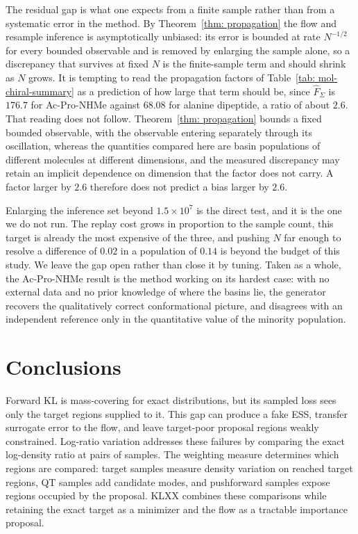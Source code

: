 \documentclass{article}
\begin{document}
The residual gap is what one expects from a finite sample rather than from a systematic error in the method. By Theorem~\ref{thm: propagation} the flow and resample inference is asymptotically unbiased: its error is bounded at rate \(N^{-1/2}\) for every bounded observable and is removed by enlarging the sample alone, so a discrepancy that survives at fixed \(N\) is the finite-sample term and should shrink as \(N\) grows. It is tempting to read the propagation factors of Table~\ref{tab: mol-chiral-summary} as a prediction of how large that term should be, since \(\hat F_\Sigma\) is \(176.7\) for Ac-Pro-NHMe against \(68.08\) for alanine dipeptide, a ratio of about \(2.6\). That reading does not follow. Theorem~\ref{thm: propagation} bounds a fixed bounded observable, with the observable entering separately through its oscillation, whereas the quantities compared here are basin populations of different molecules at different dimensions, and the measured discrepancy may retain an implicit dependence on dimension that the factor does not carry. A factor larger by \(2.6\) therefore does not predict a bias larger by \(2.6\).

Enlarging the inference set beyond \(1.5\times10^7\) is the direct test, and it is the one we do not run. The replay cost grows in proportion to the sample count, this target is already the most expensive of the three, and pushing \(N\) far enough to resolve a difference of \(0.02\) in a population of \(0.14\) is beyond the budget of this study. We leave the gap open rather than close it by tuning. Taken as a whole, the Ac-Pro-NHMe result is the method working on its hardest case: with no external data and no prior knowledge of where the basins lie, the generator recovers the qualitatively correct conformational picture, and disagrees with an independent reference only in the quantitative value of the minority population.


\section{Conclusions}
\label{sec: conclusions}

Forward KL is mass-covering for exact distributions, but its sampled loss sees only the target regions supplied to it. This gap can produce a fake ESS, transfer surrogate error to the flow, and leave target-poor proposal regions weakly constrained. Log-ratio variation addresses these failures by comparing the exact log-density ratio at pairs of samples. The weighting measure determines which regions are compared: target samples measure density variation on reached target regions, QT samples add candidate modes, and pushforward samples expose regions occupied by the proposal. KLXX combines these comparisons while retaining the exact target as a minimizer and the flow as a tractable importance proposal.
\end{document}
